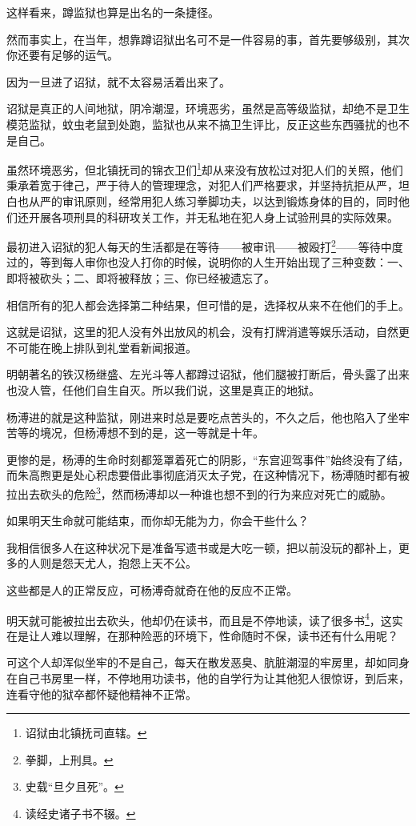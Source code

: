 \begin{multicols}{\theparacolNo}
这样看来，蹲监狱也算是出名的一条捷径。

然而事实上，在当年，想靠蹲诏狱出名可不是一件容易的事，首先要够级别，其次你还要有足够的运气。

因为一旦进了诏狱，就不太容易活着出来了。

诏狱是真正的人间地狱，阴冷潮湿，环境恶劣，虽然是高等级监狱，却绝不是卫生模范监狱，蚊虫老鼠到处跑，监狱也从来不搞卫生评比，反正这些东西骚扰的也不是自己。

虽然环境恶劣，但北镇抚司的锦衣卫们\footnote{诏狱由北镇抚司直辖。}却从来没有放松过对犯人们的关照，他们秉承着宽于律己，严于待人的管理理念，对犯人们严格要求，并坚持抗拒从严，坦白也从严的审讯原则，经常用犯人练习拳脚功夫，以达到锻炼身体的目的，同时他们还开展各项刑具的科研攻关工作，并无私地在犯人身上试验刑具的实际效果。

最初进入诏狱的犯人每天的生活都是在等待——被审讯——被殴打\footnote{拳脚，上刑具。}——等待中度过的，等到每人审你也没人打你的时候，说明你的人生开始出现了三种变数：一、即将被砍头；二、即将被释放；三、你已经被遗忘了。

相信所有的犯人都会选择第二种结果，但可惜的是，选择权从来不在他们的手上。

这就是诏狱，这里的犯人没有外出放风的机会，没有打牌消遣等娱乐活动，自然更不可能在晚上排队到礼堂看新闻报道。

明朝著名的铁汉杨继盛、左光斗等人都蹲过诏狱，他们腿被打断后，骨头露了出来也没人管，任他们自生自灭。所以我们说，这里是真正的地狱。

杨溥进的就是这种监狱，刚进来时总是要吃点苦头的，不久之后，他也陷入了坐牢苦等的境况，但杨溥想不到的是，这一等就是十年。

更惨的是，杨溥的生命时刻都笼罩着死亡的阴影，“东宫迎驾事件”始终没有了结，而朱高煦更是处心积虑要借此事彻底消灭太子党，在这种情况下，杨溥随时都有被拉出去砍头的危险\footnote{史载“旦夕且死”。}，然而杨溥却以一种谁也想不到的行为来应对死亡的威胁。

如果明天生命就可能结束，而你却无能为力，你会干些什么？

我相信很多人在这种状况下是准备写遗书或是大吃一顿，把以前没玩的都补上，更多的人则是怨天尤人，抱怨上天不公。

这些都是人的正常反应，可杨溥奇就奇在他的反应不正常。

明天就可能被拉出去砍头，他却仍在读书，而且是不停地读，读了很多书\footnote{读经史诸子书不辍。}，这实在是让人难以理解，在那种险恶的环境下，性命随时不保，读书还有什么用呢？

可这个人却浑似坐牢的不是自己，每天在散发恶臭、肮脏潮湿的牢房里，却如同身在自己书房里一样，不停地用功读书，他的自学行为让其他犯人很惊讶，到后来，连看守他的狱卒都怀疑他精神不正常。


\end{multicols}
